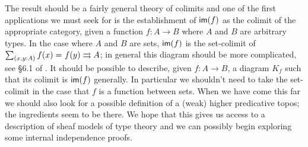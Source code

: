 The result should be a fairly general theory of colimits and one of the first
applications we must seek for is the establishment of $\mathsf{im}(f)$ as the colimit
of the appropriate category, given a function $f:A\to B$ where $A$ and $B$
are arbitrary types. In the case where $A$ and $B$ are sets, $\mathsf{im}(f)$ is
the set-colimit of $\sm{x,y:A}\id{f(x)}{f(y)}\rightrightarrows A$; in general
this diagram should be more complicated, see \S 6.1 of \cite{lurie2009higher}.
It should be possible to describe, given $f:A\to B$, a diagram $K_f$ such that
its colimit is $\mathsf{im}(f)$ generally. In particular we shouldn't need to take the
set-colimit in the case that $f$ is a function between sets.  When we have 
come this far we should also look for a possible definition of a
(weak) higher predicative topos; the ingredients seem to be there. We hope that
this gives us access to a description of sheaf models of type theory and we
can possibly begin exploring some internal independence proofs.
